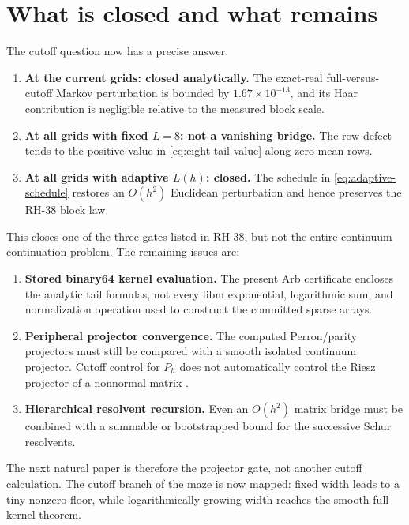 \documentclass[11pt]{article}
\theoremstyle{definition}
\theoremstyle{remark}
\begin{document}
\section{What is closed and what remains}
\label{sec:boundary}

The cutoff question now has a precise answer.

\begin{enumerate}[leftmargin=2em]
 \item \textbf{At the current grids: closed analytically.}
       The exact-real full-versus-cutoff Markov perturbation is bounded by
       $1.67\times10^{-13}$, and its Haar contribution is negligible relative
       to the measured block scale.
 \item \textbf{At all grids with fixed $L=8$: not a vanishing bridge.}
       The row defect tends to the positive value in
       \eqref{eq:eight-tail-value} along zero-mean rows.
 \item \textbf{At all grids with adaptive $L(h)$: closed.}
       The schedule in \eqref{eq:adaptive-schedule} restores an $O(h^2)$
       Euclidean perturbation and hence preserves the RH-38 block law.
\end{enumerate}

This closes one of the three gates listed in RH-38, but not the entire
continuum continuation problem.  The remaining issues are:

\begin{enumerate}[leftmargin=2em]
 \item \textbf{Stored binary64 kernel evaluation.}
       The present Arb certificate encloses the analytic tail formulas, not
       every libm exponential, logarithmic sum, and normalization operation
       used to construct the committed sparse arrays.
 \item \textbf{Peripheral projector convergence.}
       The computed Perron/parity projectors must still be compared with a
       smooth isolated continuum projector.  Cutoff control for $P_h$ does not
       automatically control the Riesz projector of a nonnormal matrix
       \citep{Kato1995,StewartSun1990}.
 \item \textbf{Hierarchical resolvent recursion.}
       Even an $O(h^2)$ matrix bridge must be combined with a summable or
       bootstrapped bound for the successive Schur resolvents.
\end{enumerate}

The next natural paper is therefore the projector gate, not another cutoff
calculation.  The cutoff branch of the maze is now mapped: fixed width leads
to a tiny nonzero floor, while logarithmically growing width reaches the
smooth full-kernel theorem.
\end{document}
